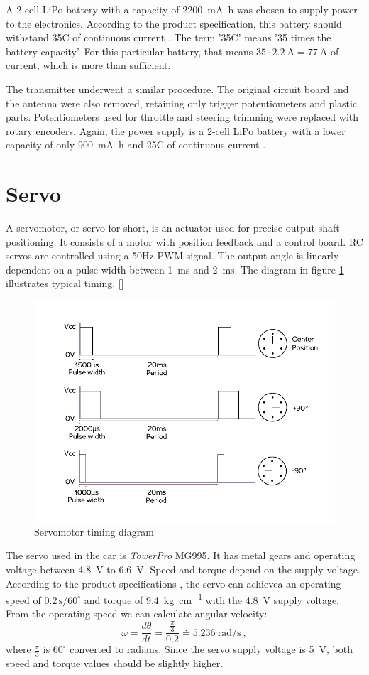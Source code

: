 A 2-cell LiPo battery with a capacity of \SI{2200}{\milli\A\hour} was chosen to supply power to the electronics. According to the product specification, this battery should withstand 35C of continuous current \cite{lipo_car}. The term '35C' means '35 times the battery capacity'. For this particular battery, that means ${35 \cdot \SI{2.2}{\A} = \SI{77}{\A}}$ of current, which is more than sufficient.

The transmitter underwent a similar procedure. The original circuit board and the antenna were also removed, retaining only trigger potentiometers and plastic parts. Potentiometers used for throttle and steering trimming were replaced with rotary encoders. Again, the power supply is a 2-cell LiPo battery with a lower capacity of only \SI{900}{\milli\A\hour} and 25C of continuous current \cite{lipo_tx}.



\section{Servo}
\label{sec:hw_servo}
A servomotor, or servo for short, is an actuator used for precise output shaft positioning. It consists of a motor with position feedback and a control board. RC servos are controlled using a 50Hz PWM signal. The output angle is linearly dependent on a pulse width between \SI{1}{\ms} and \SI{2}{\ms}. The diagram in figure \ref{fig:servo_control} illustrates typical timing. [\todo]
\begin{figure}[ht]
\centering
\includegraphics[width=0.7\linewidth]{fig/Servomotor_Timing_Diagram.pdf}
\caption{Servomotor timing diagram \cite{servo_control}}
\label{fig:servo_control}
\end{figure}

The servo used in the car is \textit{TowerPro} MG995. It has metal gears and operating voltage between \SI{4.8}{\V} to \SI{6.6}{\V}. Speed and torque depend on the supply voltage. According to the product specifications \cite{mg995}, the servo can achievea an operating speed of $0.2\, \text{s}/60^\circ$ and torque of \SI{9.4}{\kg\per\cm} with the \SI{4.8}{\V} supply voltage. From the operating speed we can calculate angular velocity: 
\begin{equation}
\omega = \frac{d \theta}{d t} = \frac{\frac{\pi}{3}}{0.2} \doteq 5.236\ \unit{\radian\per\second}\ ,
\end{equation}
where $\frac{\pi}{3}$ is $60^\circ$ converted to radians.
Since the servo supply voltage is \SI{5}{\V}, both speed and torque values should be slightly higher.


